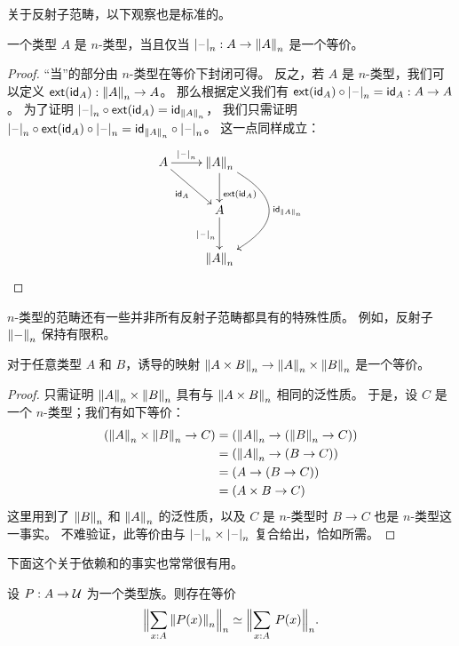 关于反射子范畴，以下观察也是标准的。

\begin{cor}
  一个类型 $A$ 是 $n$-类型，当且仅当 $\tprojf n : A \to \trunc n A$ 是一个等价。
\end{cor}

\begin{proof}
  “当”的部分由 $n$-类型在等价下封闭可得。
  反之，若 $A$ 是 $n$-类型，我们可以定义 $\ext(\idfunc[A]):\trunc n A\to{}A$。
  那么根据定义我们有 $\ext(\idfunc[A])\circ\tprojf n=\idfunc[A]:A\to{}A$。
  为了证明
  $\tprojf n\circ\ext(\idfunc[A])=\idfunc[\trunc nA]$，
  我们只需证明
  $\tprojf n\circ\ext(\idfunc[A])\circ\tprojf n=
  \idfunc[\trunc nA]\circ\tprojf n$。
  这一点同样成立：
  \[\raisebox{\depth-\height+1em}{\xymatrix{
    A \ar^-{\tprojf n}[r] \ar_{\idfunc[A]}[rd] &
    \trunc nA \ar^>>>{\ext(\idfunc[A])}[d] \ar@/^40pt/^{\idfunc[\trunc nA]}[dd] \\
    & A \ar_{\tprojf n}[d] \\
    & \trunc nA}}
  \qedhere\]
\end{proof}

$n$-类型的范畴还有一些并非所有反射子范畴都具有的特殊性质。
例如，反射子 $\trunc n-$ 保持有限积。

\begin{thm}\label{cor:trunc-prod}
  对于任意类型 $A$ 和 $B$，诱导的映射 $\trunc n{A\times B} \to \trunc nA \times \trunc nB$ 是一个等价。
\end{thm}

\begin{proof}
  只需证明 $\trunc nA \times \trunc nB$ 具有与 $\trunc n{A\times B}$ 相同的泛性质。
  于是，设 $C$ 是一个 $n$-类型；我们有如下等价：
  \begin{align*}
    (\trunc nA \times \trunc nB \to C)
    &= (\trunc nA \to (\trunc nB \to C))\\
    &= (\trunc nA \to (B \to C))\\
    &= (A \to (B \to C))\\
    &= (A \times B \to C)
  \end{align*}
  这里用到了 $\trunc nB$ 和 $\trunc nA$ 的泛性质，以及 $C$ 是 $n$-类型时 $B\to C$ 也是 $n$-类型这一事实。
  不难验证，此等价由与 $\tprojf n \times \tprojf n$ 复合给出，恰如所需。
\end{proof}

下面这个关于依赖和的事实也常常很有用。

\begin{thm}\label{thm:trunc-in-truncated-sigma}
设 $P:A\to\type$ 为一个类型族。则存在等价
\begin{equation*}
\eqv{\Trunc n{\sm{x:A}\trunc n{P(x)}}}{\Trunc n{\sm{x:A}P(x)}}.
\end{equation*}
\end{thm}


